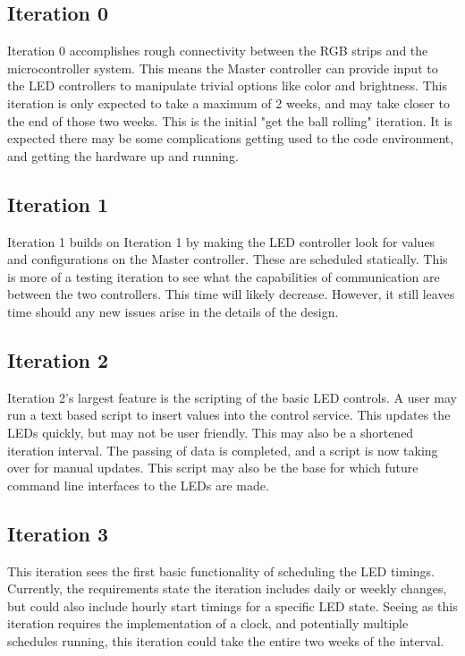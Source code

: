 		\subsection{Iteration 0}
		Iteration 0 accomplishes rough connectivity between the RGB strips and the microcontroller system. This means the Master controller can provide input
		to the LED controllers to manipulate trivial options like color and brightness. This iteration is only expected to take a maximum of 2 weeks, and may
		take closer to the end of those two weeks. This is the initial "get the ball rolling" iteration. It is expected there may be some complications
		getting used to the code environment, and getting the hardware up and running.

		\subsection{Iteration 1}
		Iteration 1 builds on Iteration 1 by making the LED controller look for values and configurations on the Master controller. These are scheduled
		statically. This is more of a testing iteration to see what the capabilities of communication are between the two controllers. This time will likely decrease.
		However, it still leaves time should any new issues arise in the details of the design.

		\subsection{Iteration 2}
		Iteration 2's largest feature is the scripting of the basic LED controls. A user may run a text based script to insert values into the control
		service. This updates the LEDs quickly, but may not be user friendly. This may also be a shortened iteration interval. The passing of
		data is completed, and a script is now taking over for manual updates. This script may also be the base for which future command line interfaces to the
		LEDs are made.

		\subsection{Iteration 3}
		This iteration sees the first basic functionality of scheduling the LED timings. Currently, the requirements state the iteration includes daily or
		weekly changes, but could also include hourly start timings for a specific LED state. Seeing as this iteration requires the implementation of a clock,
		and potentially multiple schedules running, this iteration could take the entire two weeks of the interval.

